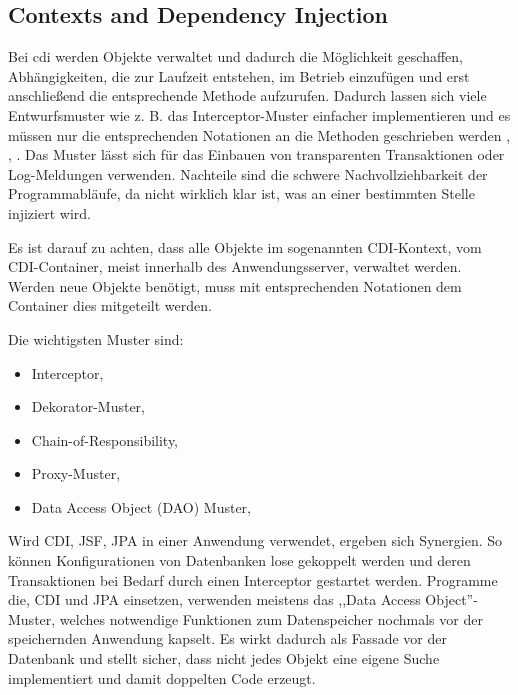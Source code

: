 \documentclass[oneside, ngerman, toc=bibliography,bibliography=totoc,listof=entryprefix, open=right,numbers=noenddot,fontsize=12pt]{scrbook}
\begin{document}
\subsection{Contexts and Dependency Injection}
Bei \acrfull{cdi} werden Objekte verwaltet und dadurch die Möglichkeit geschaffen, Abhängigkeiten, die zur Laufzeit entstehen, im Betrieb einzufügen und erst anschließend die entsprechende Methode aufzurufen. Dadurch lassen sich viele Entwurfsmuster wie z. B. das Interceptor-Muster einfacher implementieren und es müssen nur die entsprechenden Notationen an die Methoden geschrieben werden \cite{schmidt2002pattern}, \cite{gamma2011entwurfsmuster}, \cite{bien2003j2ee}. Das Muster lässt sich für das Einbauen von transparenten Transaktionen oder Log-Meldungen verwenden. Nachteile sind die schwere Nachvollziehbarkeit der Programmabläufe, da nicht wirklich klar ist, was an einer bestimmten Stelle injiziert wird.

Es ist darauf zu achten, dass alle Objekte im sogenannten {CDI-Kontext}, vom CDI-Container, meist innerhalb des Anwendungsserver, verwaltet werden. Werden neue Objekte benötigt, muss mit entsprechenden Notationen dem Container dies mitgeteilt werden.

\bigskip
Die wichtigsten Muster sind:

\begin{itemize}
    \item Interceptor, \cite{schmidt2002pattern}
    \item Dekorator-Muster, \cite{gamma2011entwurfsmuster}
    \item Chain-of-Responsibility, \cite{gamma2011entwurfsmuster}
    \item Proxy-Muster, \cite{gamma2011entwurfsmuster}
    \item Data Access Object (DAO) Muster, \cite{bien2003j2ee}
\end{itemize}

Wird {CDI}, {JSF}, {JPA} in einer Anwendung verwendet, ergeben sich Synergien. So können Konfigurationen von Datenbanken lose gekoppelt werden und deren Transaktionen bei Bedarf durch einen Interceptor gestartet werden. Programme die, {CDI} und {JPA} einsetzen, verwenden meistens das ,,Data Access Object''-Muster, welches notwendige Funktionen zum Datenspeicher nochmals vor der speichernden Anwendung kapselt. Es wirkt dadurch als Fassade vor der Datenbank und stellt sicher, dass nicht jedes Objekt eine eigene Suche implementiert und damit doppelten Code erzeugt.
\end{document}
